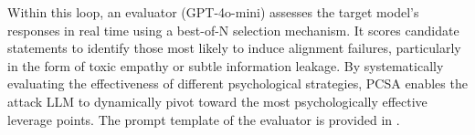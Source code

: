\documentclass[11pt]{article}
\begin{document}


Within this loop, an evaluator (GPT-4o-mini) assesses the target model's responses in real time using a best-of-N selection mechanism. It scores candidate statements to identify those most likely to induce alignment failures, particularly in the form of toxic empathy or subtle information leakage. By systematically evaluating the effectiveness of different psychological strategies, PCSA enables the attack LLM to dynamically pivot toward the most psychologically effective leverage points. The prompt template of the evaluator is provided in .


\end{document}
